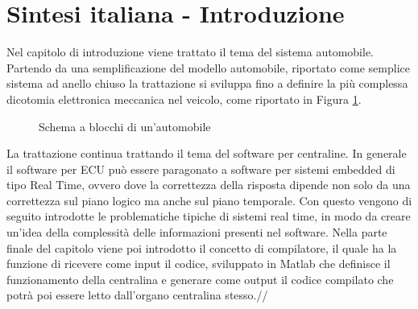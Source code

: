 \documentclass[../main.tex]{subfiles}
\begin{document}
\section{Sintesi italiana - Introduzione}
Nel capitolo di introduzione viene trattato il tema del sistema automobile. Partendo da una semplificazione del modello automobile, riportato come semplice sistema ad anello chiuso la trattazione si sviluppa fino a definire la più complessa dicotomia elettronica meccanica nel veicolo, come riportato in Figura \ref{fig:schemaablocchi}.
\begin{figure}[ht]
        \begin{center}
        \end{center}
        \caption{Schema a blocchi di un'automobile}
        \label{fig:schemaablocchi}
    \end{figure}
La trattazione continua trattando il tema del software per centraline. In generale il software per \gls{ECU} può essere paragonato a software per sistemi embedded di tipo Real Time, ovvero dove la correttezza della risposta dipende non solo da una correttezza sul piano logico ma anche sul piano temporale. Con questo vengono di seguito introdotte le problematiche tipiche di sistemi real time, in modo da creare un'idea della complessità delle informazioni presenti nel software. 
Nella parte finale del capitolo viene poi introdotto il concetto di compilatore, il quale ha la funzione di ricevere come input il codice, sviluppato in Matlab che definisce il funzionamento della centralina e generare come output il codice compilato che potrà poi essere letto dall'organo centralina stesso.//
\end{document}
